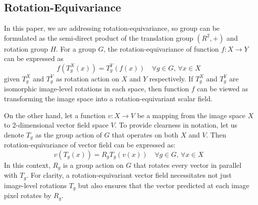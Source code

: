 \documentclass[letterpaper]{article} %
\begin{document}
\subsection{Rotation-Equivariance}
In this paper, we are addressing rotation-equivariance, so group can be formulated as the semi-direct product of the translation group \( (R^2, +) \) and rotation group \( H \). For a group \(G\), the rotation-equivariance of function \(f: X \to Y\) can be expressed as
\begin{equation}
     f\left(T^X_g(x)\right) = T^Y_g\left(f(x)\right)  \quad \forall g \in G ,\, \forall x \in X
\end{equation}
 given \(T^X_g\) and \(T^Y_g\) as rotation action on \(X\) and \(Y\) respectively. If \(T^X_g\) and \(T^Y_g\) are isomorphic image-level rotations in each space, then function \(f\) can be viewed as transforming the image space into a rotation-equivariant scalar field.

On the other hand, let a function \(v: X \to V\) be a mapping from the image space \(X\) to 2-dimensional vector field space \(V\). To provide clearness in notation,  let us denote \(T_g\)  as the group action of \(G\) that operates on both \(X\) and \(V\). Then rotation-equivariance of vector field can be expressed as:
\begin{equation}
     v\left(T_g(x)\right) = R_g T_g\left(v(x)\right)  \quad \forall g \in G ,\, \forall x \in X
\end{equation}
In this context, \(R_g\) is a group action on \(G\) that rotates every vector in parallel with \(T_g\). For clarity, a rotation-equivariant vector field necessitates not just image-level rotations \(T_g\) but also ensures that the vector predicted at each image pixel rotates by \(R_g\).


\end{document}
